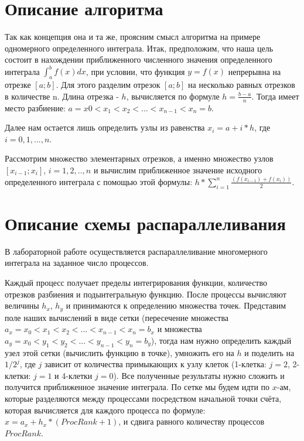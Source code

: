 \documentclass{report}
\begin{document}
\newpage

\section*{Описание алгоритма}
Так как концепция она и та же, проясним смысл алгоритма на примере одномерного определенного интеграла. Итак, предположим, что наша цель состоит в нахождении приближенного численного значения определенного интеграла $\int_a^b f(x)dx$, при условии, что функция $y = f(x)$ непрерывна на отрезке $[a;b]$. Для этого разделим отрезок $[a;b]$ на несколько равных отрезков в количестве n. Длина отрезка - $h$, вычисляется по формуле $h=\frac{b-a}{n}$. Тогда имеет место разбиение: $a=x0<x_1<x_2<...<x_{n-1}<x_n=b$.
\par Далее нам остается лишь определить узлы из равенства $x_i=a+i * h$, где $i=0, 1,..., n$.
\par Рассмотрим множество элементарных отрезков, а именно множество узлов $[x_{i-1}; x_i]$, $i=1, 2,.., n$ и вычислим приближенное значение исходного определенного интеграла с помощью этой формулы: $h*\sum\limits_{i=1}^n\frac{(f(x_{i-1})+f(x_i))}{2}$.
\newpage

\section*{Описание схемы распараллеливания}
В лабораторной работе осуществляется распараллеливание многомерного интеграла на заданное число процессов. 
\par Каждый процесс получает пределы интегрирования функции, количество отрезков разбиения и подынтегральную функцию. После процессы вычисляют величины $h_x$, $h_y$ и принимаются к определению множества точек. Представим поле наших вычислений в виде сетки (пересечение множества $a_x=x_0<x_1<x_2<...<x_{n-1}<x_{n}=b_x$ и множества $a_y=x_0<y_1<y_2<...<y_{n-1}<y_{n}=b_y$), тогда нам нужно определить каждый узел этой сетки (вычислить функцию в точке), умножить его на $h$ и поделить на $1/2^j$, где $j$ зависит от количества примыкающих к узлу клеток (1-клетка: $j=2$, 2-клетки: $j=1$ и 4-клетки $j=0$). Все полученные результаты нужно сложить и получится приближенное значение интеграла. По сетке мы будем идти по $x$-ам, которые разделяются между процессами посредством начальной точки счёта, которая вычисляется для каждого процесса по формуле: $x = a_x + h_x * (ProcRank + 1)$, и сдвига равного количеству процессов $ProcRank$.
\newpage
\end{document}
